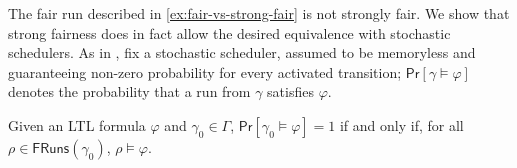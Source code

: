 \documentclass[10pt,a4paper]{article}
\newcommand{\prot}{\mathcal{P}}
\newcommand{\fairrunsfrom}[1]{\mathsf{FRuns}(#1)}
\newcommand{\config}{\gamma}
\newcommand{\configs}{\Gamma}
\newcommand{\run}{\rho}
\newcommand{\transitions}{\Delta}
\newcommand{\PP}{\mathcal{P}}                  %
\newcommand*{\buchiaut}{\mathcal{A}}
\newcommand*{\ltlaut}[1]{\buchiaut_{#1}}
\newcommand{\bstates}{\mathcal{L}}
\newcommand{\btransitions}{T}
\newcommand*{\abuchistate}{\ell}
\newcommand*{\bstate}{\abuchistate}
\newcommand*{\binitstate}{\bstate_0}
\newcommand*{\bwinning}{\mathcal{W}}
\newcommand{\pr}[2]{\mathsf{Pr}[#1 \models #2]}
\begin{document}
The fair run described in \cref{ex:fair-vs-strong-fair} is not strongly fair.
We show that strong fairness does in fact allow the desired equivalence with stochastic schedulers.
As in \cite{EGLM16}, fix a stochastic scheduler, assumed to be memoryless and guaranteeing non-zero probability for every activated transition; \(\pr{\config}{\varphi}\) denotes the probability that a run from \(\config\) satisfies \(\varphi\).
\begin{propositionrep}
	\label{strong-fairness-stochastic-scheduler}
	Given an LTL formula \(\varphi\) and \(\config_0 \in \configs\), \(\pr{\config_0}{\varphi} = 1\) if and only if, for all \(\run \in \fairrunsfrom{\config_0}\), \(\run \models \varphi\).
\end{propositionrep}

\end{document}
